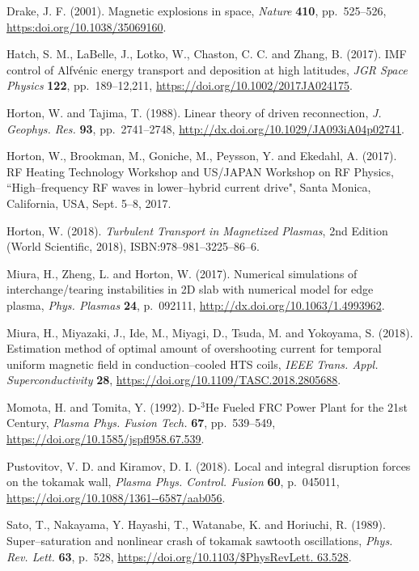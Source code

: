 \documentclass[a4paper,openany,12pt]{book}
\begin{document}
\begin{thebibliography}{175}
\bibitem{}
Drake, J. F. (2001). Magnetic explosions in space, {\it Nature} \textbf{410}, pp.~525--526, 
\url{https:doi.org/10.1038/35069160}.

\bibitem{}
Hatch, S. M., LaBelle, J., Lotko, W., Chaston, C. C. and Zhang, B. (2017). IMF control of Alfv\'enic energy transport and deposition at high latitudes, {\it JGR Space Physics} \textbf{122}, pp.~189--12,211, \url{https://doi.org/10.1002/2017JA024175}.

\bibitem{}
Horton, W. and Tajima, T. (1988). Linear theory of driven reconnection, {\it J. Geophys. Res.} \textbf{93}, pp.~2741--2748, \url{http://dx.doi.org/10.1029/JA093iA04p02741}.

\bibitem{}
Horton, W., Brookman, M., Goniche, M., Peysson, Y. and Ekedahl, A. (2017). RF Heating Technology Workshop and US/JAPAN Workshop on RF Physics, ``High--frequency RF waves in lower--hybrid current drive", Santa Monica, California, USA, Sept. 5--8, 2017.

\bibitem{}
Horton, W. (2018). {\it Turbulent Transport in Magnetized Plasmas}, 2nd Edition (World Scientific, 2018), ISBN:978--981--3225--86--6.

\bibitem{}
Miura, H., Zheng, L. and Horton, W. (2017). Numerical simulations of interchange/tearing instabilities in 2D slab with numerical model for edge plasma, {\it Phys. Plasmas} \textbf{24}, p.~092111, \url{http://dx.doi.org/10.1063/1.4993962}.

\bibitem{}
Miura, H., Miyazaki, J., Ide, M., Miyagi, D., Tsuda, M. and Yokoyama, S. (2018). Estimation method of optimal amount of overshooting current for temporal uniform magnetic field in conduction--cooled HTS coils, {\it IEEE Trans. Appl. Superconductivity} \textbf{28}, \url{https://doi.org/10.1109/TASC.2018.2805688}.

\bibitem{}
Momota, H. and Tomita, Y. (1992). D-$^3$He Fueled FRC Power Plant for the 21st Century, {\it Plasma Phys. Fusion Tech.} \textbf{67}, pp.~539--549, \url{https://doi.org/10.1585/jspfl958.67.539}.

\bibitem{}
Pustovitov, V. D. and Kiramov, D. I. (2018). Local and integral disruption forces on the tokamak wall, {\it Plasma Phys. Control. Fusion} \textbf{60}, p.~045011, \url{https://doi.org/10.1088/1361--6587/aab056}.

\bibitem{}
Sato, T., Nakayama, Y. Hayashi, T., Watanabe, K. and Horiuchi, R. (1989). Super--saturation and nonlinear crash of tokamak sawtooth oscillations, {\it Phys. Rev. Lett.} \textbf{63}, p.~528, 
\url{https://doi.org/10.1103/$PhysRevLett. 63.528}.


\end{thebibliography}
\end{document}
